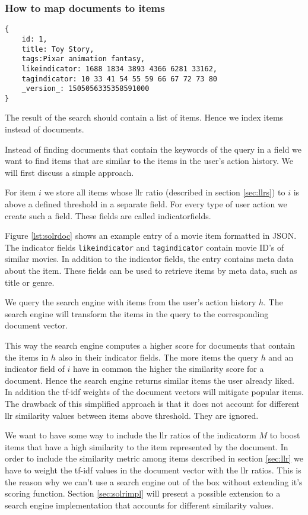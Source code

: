 \subsubsection{How to map documents to items}
\label{sec:mapping}

\begin{lstlisting}[caption={Item meta data and similar items are stored in Solr.},label={lst:solrdoc}]
{
    id: 1,
    title: Toy Story,
    tags:Pixar animation fantasy,
    likeindicator: 1688 1834 3893 4366 6281 33162,
    tagindicator: 10 33 41 54 55 59 66 67 72 73 80
    _version_: 1505056335358591000
}
\end{lstlisting}

The result of the search should contain a list of items. Hence we index items instead of documents.

Instead of finding documents that contain the keywords of the query in a field we want to find items that are similar to the items in the user's action history. We will first discuss a simple approach. 

For item $i$ we store all items whose \gls{llr} ratio (described in section \ref{sec:llrs}) to $i$ is above a defined threshold in a separate field. For every type of user action we create such a field. These fields are called \glspl{indicatorfield}. 

Figure \ref{lst:solrdoc} shows an example entry of a movie item formatted in JSON. The indicator fields \verb|likeindicator| and \verb|tagindicator| contain movie ID's of similar movies. In addition to the indicator fields, the entry contains meta data about the item. These fields can be used to retrieve items by meta data, such as title or genre.

We query the search engine with items from the user's action history $h$. The search engine will transform the items in the query to the corresponding document vector. 

This way the search engine computes a higher score for documents that contain the items in $h$ also in their indicator fields. The more items the query $h$ and an indicator field of $i$ have in common the higher the similarity score for a document. Hence the search engine returns similar items the user already liked. In addition the tf-idf weights of the document vectors will mitigate popular items. The drawback of this simplified approach is that it does not account for different \gls{llr} similarity values between items above threshold. They are ignored.

 We want to have some way to include the \gls{llr} ratios of the \gls{indicatorm} $M$ to boost items that have a high similarity to the item represented by the document. In order to include the similarity metric among items described in section \ref{sec:llr} we have to weight the tf-idf values in the document vector with the \gls{llr} ratios. This is the reason why we can't use a search engine out of the box without extending it's scoring function. Section \ref{sec:solrimpl} will present a possible extension to a search engine implementation that accounts for different similarity values.

